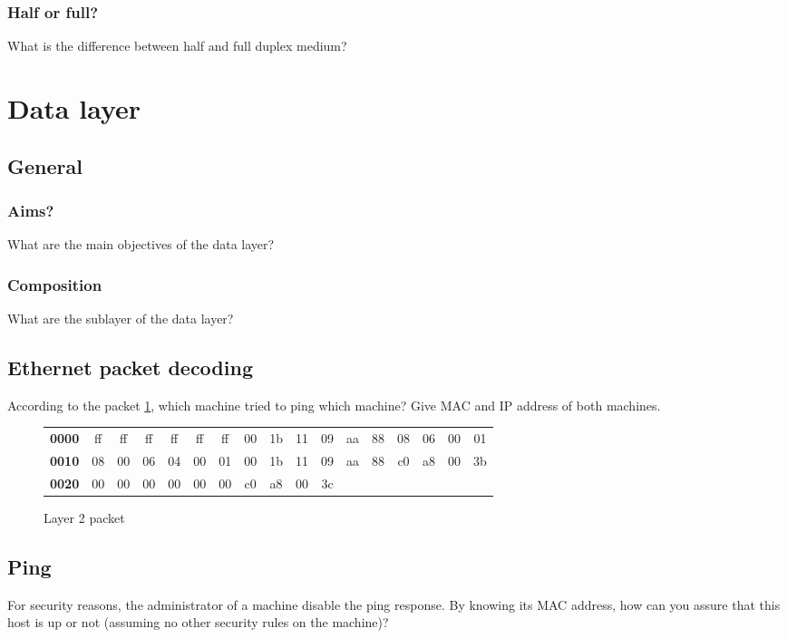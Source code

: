 \documentclass[11pt]{article}
\begin{document}
\subsubsection{Half or full?}
What is the difference between half and full duplex medium?

\pagebreak
\section{Data layer}
\subsection{General}
\subsubsection{Aims?}
What are the main objectives of the data layer?
\subsubsection{Composition}
What are the sublayer of the data layer?
\subsection{Ethernet packet decoding}
According to the packet \ref{fig:arp_req_ex}, which machine tried to ping which machine? Give MAC and IP address of both machines.
  \begin{figure}[h]
  \centering
  \resizebox{17cm}{!} {
    \begin{tabular}{lcccccccccccccccc}
      \textbf{0000} & ff & ff & ff & ff & ff & ff & 00 & 1b & 11 & 09 & aa & 88 & 08 & 06 & 00 & 01 \\
      \textbf{0010} & 08 & 00 & 06 & 04 & 00 & 01 & 00 & 1b & 11 & 09 & aa & 88 & c0 & a8 & 00 & 3b \\
      \textbf{0020} & 00 & 00 & 00 & 00 & 00 & 00 & c0 & a8 & 00 & 3c \\
    \end{tabular}
  }
  \caption{Layer 2 packet}
  \label{fig:arp_req_ex}
  \end{figure}
\subsection{Ping}
For security reasons, the administrator of a machine disable the ping response. By knowing its MAC address, how can you assure that this host is up or not (assuming no other security rules on the machine)?
\end{document}
